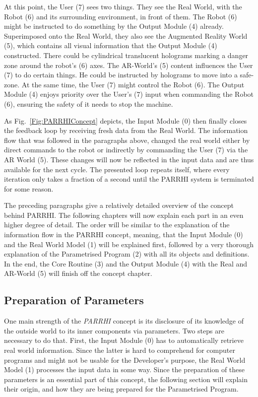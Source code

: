 At this point, the User (7) sees two things. They see the Real World, with the Robot (6) and its surrounding environment, in front of them. The Robot (6) might be instructed to do something by the Output Module (4) already. Superimposed onto the Real World, they also see the Augmented Reality World (5), which contains all visual information that the Output Module (4) constructed. There could be cylindrical translucent holograms marking a danger zone around the robot's (6) axes. The AR-World's (5) content influences the User (7) to do certain things. He could be instructed by holograms to move into a safe-zone. At the same time, the User (7) might control the Robot (6). The Output Module (4) enjoys priority over the User's (7) input when commanding the Robot (6), ensuring the safety of it needs to stop the machine.

As Fig.~\ref{Fig:PARRHIConcept} depicts, the Input Module (0) then finally closes the feedback loop by receiving fresh data from the Real World. The information flow that was followed in the paragraphs above, changed the real world either by direct commands to the robot or indirectly by commanding the User (7) via the AR World (5). These changes will now be reflected in the input data and are thus available for the next cycle. The presented loop repeats itself, where every iteration only takes a fraction of a second until the PARRHI system is terminated for some reason. 

The preceding paragraphs give a relatively detailed overview of the concept behind PARRHI. The following chapters will now explain each part in an even higher degree of detail. The order will be similar to the explanation of the information flow in the PARRHI concept, meaning, that the Input Module (0) and the Real World Model (1) will be explained first, followed by a very thorough explanation of the Parametrised Program (2) with all its objects and definitions. In the end, the Core Routine (3) and the Output Module (4) with the Real and AR-World (5) will finish off the concept chapter.


\subsection{Preparation of Parameters}
One main strength of the \textit{PARRHI} concept is its disclosure of its knowledge of the outside world to its inner components via parameters. Two steps are necessary to do that. First, the Input Module (0) has to automatically retrieve real world information. Since the latter is hard to comprehend for computer programs and might not be usable for the Developer's purpose, the Real World Model (1) processes the input data in some way. Since the preparation of these parameters is an essential part of this concept, the following section will explain their origin, and how they are being prepared for the Parametrised Program. 

